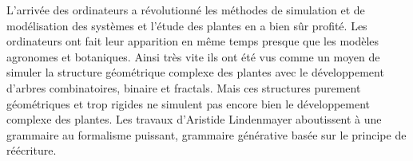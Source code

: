 L’arrivée des ordinateurs a révolutionné les méthodes de simulation et de modélisation des systèmes et l’étude des plantes en a bien sûr profité.
Les ordinateurs ont fait leur apparition en même temps presque que les modèles agronomes et botaniques. Ainsi très vite ils ont été vus comme un moyen de simuler la structure géométrique complexe des plantes avec le développement d’arbres combinatoires, binaire et fractals. Mais ces structures purement géométriques et trop rigides ne simulent pas encore bien le développement complexe des plantes.
Les travaux d’Aristide Lindenmayer aboutissent à une grammaire au formalisme puissant, grammaire générative basée sur le principe de réécriture.

